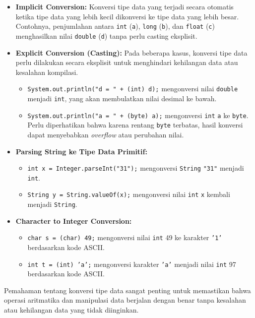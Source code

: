 \begin{itemize}
	\item \textbf{Implicit Conversion:} Konversi tipe data yang terjadi secara otomatis ketika tipe data yang lebih kecil dikonversi ke tipe data yang lebih besar. Contohnya, penjumlahan antara \texttt{int} (\texttt{a}), \texttt{long} (\texttt{b}), dan \texttt{float} (\texttt{c}) menghasilkan nilai \texttt{double} (\texttt{d}) tanpa perlu casting eksplisit.
	
	\item \textbf{Explicit Conversion (Casting):} Pada beberapa kasus, konversi tipe data perlu dilakukan secara eksplisit untuk menghindari kehilangan data atau kesalahan kompilasi.
	\begin{itemize}
		\item \texttt{System.out.println("d = " + (int) d);} mengonversi nilai \texttt{double} menjadi \texttt{int}, yang akan membulatkan nilai desimal ke bawah.
		\item \texttt{System.out.println("a = " + (byte) a);} mengonversi \texttt{int} \texttt{a} ke \texttt{byte}. Perlu diperhatikan bahwa karena rentang \texttt{byte} terbatas, hasil konversi dapat menyebabkan \textit{overflow} atau perubahan nilai.
	\end{itemize}
	
	\item \textbf{Parsing String ke Tipe Data Primitif:} 
	\begin{itemize}
		\item \texttt{int x = Integer.parseInt("31");} mengonversi \texttt{String} \texttt{"31"} menjadi \texttt{int}.
		\item \texttt{String y = String.valueOf(x);} mengonversi nilai \texttt{int} \texttt{x} kembali menjadi \texttt{String}.
	\end{itemize}
	
	\item \textbf{Character to Integer Conversion:} 
	\begin{itemize}
		\item \texttt{char s = (char) 49;} mengonversi nilai \texttt{int} 49 ke karakter \texttt{'1'} berdasarkan kode ASCII.
		\item \texttt{int t = (int) 'a';} mengonversi karakter \texttt{'a'} menjadi nilai \texttt{int} 97 berdasarkan kode ASCII.
	\end{itemize}
\end{itemize}

Pemahaman tentang konversi tipe data sangat penting untuk memastikan bahwa operasi aritmatika dan manipulasi data berjalan dengan benar tanpa kesalahan atau kehilangan data yang tidak diinginkan.


